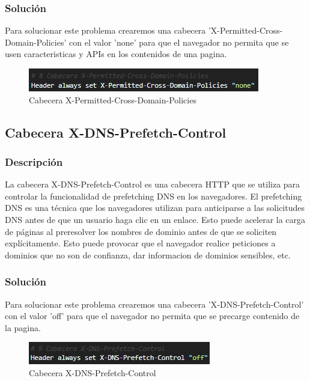 \documentclass{report}
\begin{document}
                \subsubsection{Solución}
                    Para solucionar este problema crearemos una cabecera 'X-Permitted-Cross-Domain-Policies' con el valor 'none' para que el navegador no permita que se usen caracteristicas y APIs en los contenidos de una pagina.
                    \begin{figure}[H]
                        \centering
                        \includegraphics[width=\textwidth]{./img/vulnerabilidades/3.5/8.1.png}
                        \caption{Cabecera X-Permitted-Cross-Domain-Policies}
                    \end{figure}
            \clearpage
            \subsection{Cabecera X-DNS-Prefetch-Control}
                \subsubsection{Descripción}
                    La cabecera X-DNS-Prefetch-Control es una cabecera HTTP que se utiliza para controlar la funcionalidad de prefetching DNS en los navegadores. El prefetching DNS es una técnica que los navegadores utilizan para anticiparse a las solicitudes DNS antes de que un usuario haga clic en un enlace. Esto puede acelerar la carga de páginas al preresolver los nombres de dominio antes de que se soliciten explícitamente.
                    Esto puede provocar que el navegador realice peticiones a dominios que no son de confianza, dar informacion de dominios sensibles, etc.
                \subsubsection{Solución}
                    Para solucionar este problema crearemos una cabecera 'X-DNS-Prefetch-Control' con el valor 'off' para que el navegador no permita que se precarge contenido de la pagina.
                    \begin{figure}[H]
                        \centering
                        \includegraphics[width=\textwidth]{./img/vulnerabilidades/3.5/9.1.png}
                        \caption{Cabecera X-DNS-Prefetch-Control}
                    \end{figure}
            \clearpage
\end{document}
